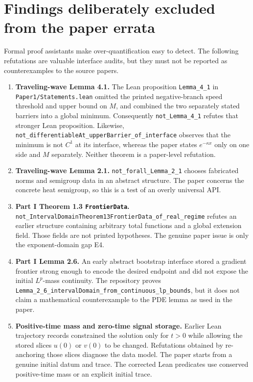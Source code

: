 \documentclass[11pt]{article}
\newcommand{\code}[1]{\nolinkurl{#1}}
\begin{document}
\section{Findings deliberately excluded from the paper errata}

Formal proof assistants make over-quantification easy to detect.  The
following refutations are valuable interface audits, but they must not be
reported as counterexamples to the source papers.

\begin{enumerate}[leftmargin=2em,itemsep=5pt]
\item \textbf{Traveling-wave Lemma 4.1.}
  The Lean proposition \code{Lemma_4_1} in
  \code{Paper1/Statements.lean} omitted the printed negative-branch speed
  threshold and upper bound on \(M\), and combined the two separately stated
  barriers into a global minimum.  Consequently \code{not_Lemma_4_1} refutes
  that stronger Lean proposition.  Likewise,
  \code{not_differentiableAt_upperBarrier_of_interface} observes that the
  minimum is not \(C^1\) at its interface, whereas the paper states
  \(e^{-\kappa x}\) only on one side and \(M\) separately.  Neither theorem is
  a paper-level refutation.

\item \textbf{Traveling-wave Lemma 2.1.}
  \code{not_forall_Lemma_2_1} chooses fabricated norms and semigroup data in
  an abstract structure.  The paper concerns the concrete heat semigroup, so
  this is a test of an overly universal API.

\item \textbf{Part I Theorem 1.3 \code{FrontierData}.}
  \code{not_IntervalDomainTheorem13FrontierData_of_real_regime} refutes an
  earlier structure containing arbitrary total functions and a global
  extension field.  Those fields are not printed hypotheses.  The genuine
  paper issue is only the exponent-domain gap E4.

\item \textbf{Part I Lemma 2.6.}
  An early abstract bootstrap interface stored a gradient frontier strong
  enough to encode the desired endpoint and did not expose the initial
  \(L^p\)-mass continuity.  The repository proves
  \code{Lemma_2_6_intervalDomain_from_continuous_lp_bounds}, but it does not
  claim a mathematical counterexample to the PDE lemma as used in the paper.

\item \textbf{Positive-time mass and zero-time signal storage.}
  Earlier Lean trajectory records constrained the solution only for \(t>0\)
  while allowing the stored slices \(u(0)\) or \(v(0)\) to be changed.
  Refutations obtained by re-anchoring those slices diagnose the data model.
  The paper starts from a genuine initial datum and trace.  The corrected Lean
  predicates use conserved positive-time mass or an explicit initial trace.
\end{enumerate}
\end{document}
